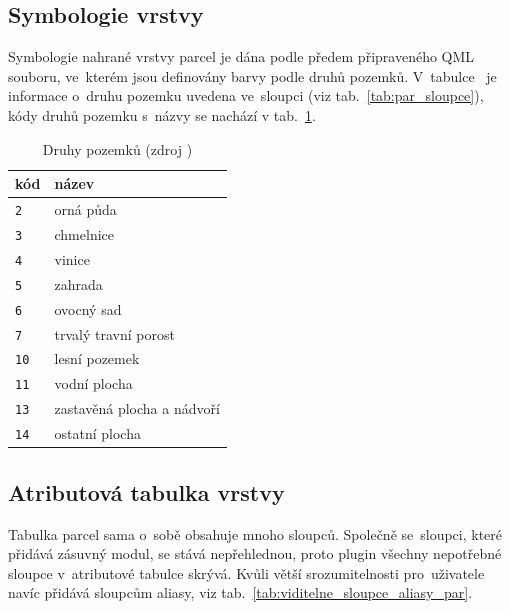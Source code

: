 \subsection{Symbologie vrstvy \texttt{}}
\label{symbologie_par}

Symbologie nahrané vrstvy parcel je dána podle předem připraveného QML souboru, ve~kterém jsou definovány barvy podle druhů pozemků. V~tabulce~\texttt{} je informace o~druhu pozemku uvedena ve~sloupci \texttt{} (viz tab.~\ref{tab:par_sloupce}), kódy druhů pozemku s~názvy se nachází v tab.~\ref{tab:druhy_pozemku}.

\begin{table}[H]
    \begin{tabular}{|l|l|}
        \hline
         kód & název \\
        \hline
        \hline
          \texttt{2} & orná půda \\ \hline
          \texttt{3} & chmelnice \\ \hline          
          \texttt{4} & vinice \\ \hline
          \texttt{5} & zahrada \\ \hline
          \texttt{6} & ovocný sad \\ \hline
          \texttt{7} & trvalý travní porost \\ \hline
          \texttt{10} & lesní pozemek \\ \hline
          \texttt{11} & vodní plocha \\ \hline
          \texttt{13} & zastavěná plocha a nádvoří \\ \hline
          \texttt{14} & ostatní plocha \\
         \hline
    \end{tabular}
    \centering
    \caption[Druhy pozemků]{Druhy pozemků (zdroj \citep{vyhlaska_357})}
    \label{tab:druhy_pozemku}
\end{table}

\newpage

\subsection{Atributová tabulka vrstvy \texttt{}}
\label{tabulka_par}

Tabulka parcel sama o~sobě obsahuje mnoho sloupců. Společně se~sloupci, které přidává zásuvný modul, se stává nepřehlednou, proto plugin všechny nepotřebné sloupce v~atributové tabulce skrývá. Kvůli větší srozumitelnosti pro~uživatele navíc přidává sloupcům aliasy, viz tab.~\ref{tab:viditelne_sloupce_aliasy_par}.

